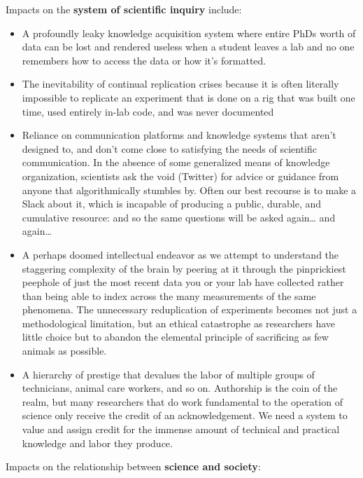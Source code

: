 \documentclass[10pt]{article}
\begin{document}
\begin{multicols}{2}
Impacts on the \textbf{system of scientific inquiry} include:

\begin{itemize}

\item
  A profoundly leaky knowledge acquisition system where entire PhDs
  worth of data can be lost and rendered useless when a student leaves a
  lab and no one remembers how to access the data or how it's formatted.
\item
  The inevitability of continual replication crises because it is often
  literally impossible to replicate an experiment that is done on a rig
  that was built one time, used entirely in-lab code, and was never
  documented
\item
  Reliance on communication platforms and knowledge systems that aren't
  designed to, and don't come close to satisfying the needs of
  scientific communication. In the absence of some generalized means of
  knowledge organization, scientists ask the void (Twitter) for advice
  or guidance from anyone that algorithmically stumbles by. Often our
  best recourse is to make a Slack about it, which is incapable of
  producing a public, durable, and cumulative resource: and so the same
  questions will be asked again\ldots{} and again\ldots{}
\item
  A perhaps doomed intellectual endeavor as we attempt to understand the staggering
  complexity of the brain by peering at it through the pinprickiest
  peephole of just the most recent data you or your lab have collected
  rather than being able to index across the many measurements of the
  same phenomena. The unnecessary reduplication of experiments becomes
  not just a methodological limitation, but an ethical catastrophe as
  researchers have little choice but to abandon the elemental principle
  of sacrificing as few animals as possible.
\item
  A hierarchy of prestige that devalues the labor of multiple groups of
  technicians, animal care workers, and so on. Authorship is the coin of
  the realm, but many researchers that do work fundamental to the
  operation of science only receive the credit of an acknowledgement. We
  need a system to value and assign credit for the immense amount of
  technical and practical knowledge and labor they produce.
\end{itemize}

Impacts on the relationship between \textbf{science and society}:

\begin{itemize}


\end{itemize}
\end{multicols}
\end{document}

